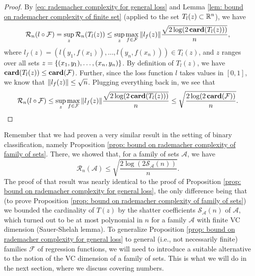 \begin{proof}
By \eqref{eq: rademacher complexity for general loss} and Lemma \ref{lem: bound on rademacher complexity of finite set} (applied to the set $T_l(z) \subset \mathbb{R}^n$), we have
\[
    \mathcal{R}_n(l \circ \mathcal{F}) = \sup_z \mathcal{R}_n(T_l(z)) \leq \sup_z \max_{f \in \mathcal{F}} \norm{l_f(z)} \frac{\sqrt{2 \log(2 \, \mathrm{\mathbf{card}}(T_l(z)))}}{n},
\]
where $l_f(z) = ( l(y_1, f(x_1)), \dots, l(y_n, f(x_n)) ) \in T_l(z)$, and $z$ ranges over all sets $z = \left\{(x_1, y_1), \dots, (x_n, y_n)\right\}$. By definition of $T_l(z)$, we have $\mathrm{\mathbf{card}}(T_l(z)) \leq \mathrm{\mathbf{card}}(\mathcal{F})$. Further, since the loss function $l$ takes values in $[0, 1]$, we know that $\norm{l_f(z)} \leq \sqrt{n}$. Plugging everything back in, we see that
\[
    \mathcal{R}_n(l \circ \mathcal{F}) \leq \sup_z \max_{f \in \mathcal{F}} \norm{l_f(z)} \frac{\sqrt{2 \log(2 \, \mathrm{\mathbf{card}}(T_l(z)))}}{n} \leq \sqrt{\frac{2 \log(2 \, \mathrm{\mathbf{card}}(\mathcal{F}))}{n}}.
\]
\end{proof}

Remember that we had proven a very similar result in the setting of binary classification, namely Proposition \ref{prop: bound on rademacher complexity of family of sets}. There, we showed that, for a family of sets $\mathcal{A}$, we have
\[
    \mathcal{R}_n(\mathcal{A}) \leq \sqrt{\frac{2 \log(2 \mathcal{S}_{\mathcal{A}}(n))}{n}}.
\]
The proof of that result was nearly identical to the proof of Proposition \ref{prop: bound on rademacher complexity for general loss}, the only difference being that (to prove Proposition \ref{prop: bound on rademacher complexity of family of sets}) we bounded the cardinality of $T(z)$ by the shatter coefficients $\mathcal{S}_{\mathcal{A}}(n)$ of $\mathcal{A}$, which turned out to be at most polynomial in $n$ for a family $\mathcal{A}$ with finite VC dimension (Sauer-Shelah lemma). To generalize Proposition \ref{prop: bound on rademacher complexity for general loss} to general (i.e., not necessarily finite) families $\mathcal{F}$ of regression functions, we will need to introduce a suitable alternative to the notion of the VC dimension of a family of sets. This is what we will do in the next section, where we discuss covering numbers.
